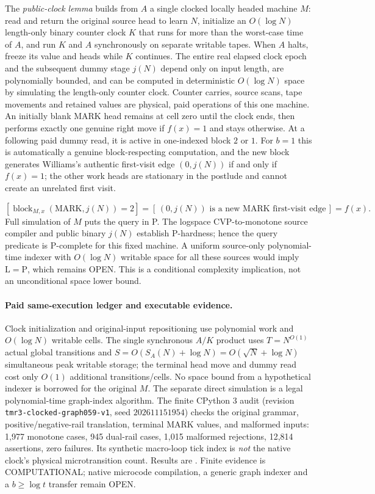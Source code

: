 \documentclass[11pt]{article}
\begin{document}
The \emph{public-clock lemma} builds from $A$ a single
clocked locally headed machine $M$: read and return the
original source head to learn $N$, initialize an $O(\log N)$
length-only binary counter clock $K$ that runs for more than
the worst-case time of $A$, and run $K$ and $A$
synchronously on separate writable tapes.
When $A$ halts, freeze its value and heads while $K$ continues.
The entire real elapsed clock epoch and the subsequent
dummy stage $j(N)$ depend only on input length, are polynomially
bounded, and can be computed in deterministic $O(\log N)$
space by simulating the length-only counter clock.
Counter carries, source scans, tape movements and retained
values are physical, paid operations of this one machine.
An initially blank MARK head remains at cell zero until
the clock ends, then performs exactly one genuine right move
if $f(x)=1$ and stays otherwise. At a following paid dummy
read, it is active in one-indexed block $2$ or $1$.
For $b=1$ this is automatically a genuine block-respecting
computation, and the new block generates Williams's authentic
first-visit edge $(0,j(N))$ if and only if $f(x)=1$;
the other work heads are stationary in the postlude and
cannot create an unrelated first visit.

\[
 [\operatorname{block}_{M,x}(\mathrm{MARK},j(N))=2]
  =[\,(0,j(N))\text{ is a new MARK first-visit edge}\,]
  =f(x).
\]
Full simulation of $M$ puts the query in P.
The logspace CVP-to-monotone source compiler and public binary
$j(N)$ establish P-hardness; hence the query predicate is
P-complete for this fixed machine. A uniform source-only
polynomial-time indexer with $O(\log N)$ writable space
for all these sources would imply $\mathrm L=\mathrm P$,
which remains OPEN. This is a conditional complexity implication,
not an unconditional space lower bound.

\paragraph{Paid same-execution ledger and executable evidence.}
Clock initialization and original-input repositioning use
polynomial work and $O(\log N)$ writable cells.
The single synchronous $A/K$ product uses
$T=N^{O(1)}$ actual global transitions and
$S=O(S_A(N)+\log N)=O(\sqrt N+\log N)$
simultaneous peak writable storage; the terminal head move
and dummy read cost only $O(1)$ additional transitions/cells.
No space bound from a hypothetical indexer is borrowed
for the original $M$. The separate direct simulation is
a legal polynomial-time graph-index algorithm.
The finite CPython 3 audit
(revision \texttt{tmr3-clocked-graph059-v1},
seed $202611151954$) checks the original grammar,
positive/negative-rail translation, terminal MARK values,
and malformed inputs: 1,977 monotone cases, 945 dual-rail
cases, 1,015 malformed rejections, 12,814 assertions, zero failures.
Its synthetic macro-loop tick index is \emph{not} the native
clock's physical microtransition count. Results are
.
Finite evidence is COMPUTATIONAL; native microcode compilation,
a generic graph indexer and a $b\ge\log t$ transfer remain OPEN.
\end{document}
